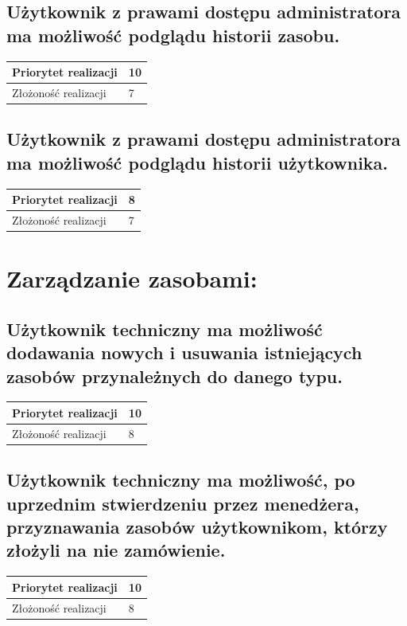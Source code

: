 \documentclass[11pt, a4paper, oneside]{report}
\begin{document}
\subsection{Użytkownik z prawami dostępu administratora ma możliwość podglądu historii zasobu.}
\begin{center}
\begin{tabular}[c]{| l | l | }
  \hline			
  Priorytet realizacji & 10 \\
  \hline
  Złożoność realizacji & 7 \\
  \hline  
\end{tabular}
\end{center}
\subsection{Użytkownik z prawami dostępu administratora ma możliwość podglądu historii użytkownika.}
\begin{center}
\begin{tabular}[c]{| l | l | }
  \hline			
  Priorytet realizacji & 8 \\
  \hline
  Złożoność realizacji & 7 \\
  \hline  
\end{tabular}
\end{center}
\section{Zarządzanie zasobami:}
\subsection{Użytkownik techniczny ma możliwość dodawania nowych i usuwania istniejących zasobów przynależnych do danego typu.}
\begin{center}
\begin{tabular}[c]{| l | l | }
  \hline			
  Priorytet realizacji & 10 \\
  \hline
  Złożoność realizacji & 8 \\
  \hline  
\end{tabular}
\end{center}
\subsection{Użytkownik techniczny ma możliwość, po uprzednim  stwierdzeniu przez menedżera, przyznawania zasobów użytkownikom, którzy złożyli na nie zamówienie.}
\begin{center}
\begin{tabular}[c]{| l | l | }
  \hline			
  Priorytet realizacji & 10 \\
  \hline
  Złożoność realizacji & 8 \\
  \hline  
\end{tabular}
\end{center}
\end{document}
